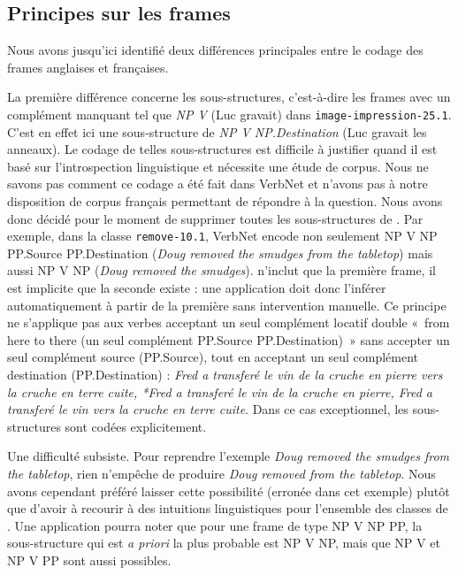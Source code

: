 \subsection{Principes sur les frames}\label{princp}

Nous avons jusqu'ici identifié deux différences principales entre le codage des
frames anglaises et françaises.

La première différence concerne les sous-structures, c'est-à-dire les frames
avec un complément manquant tel que \textit{NP V} (Luc gravait) dans
{\color{blue}\texttt{image-impression-25.1}}. C'est en effet ici une
sous-structure de \textit{NP V NP.Destination} (Luc gravait les anneaux). Le
codage de telles sous-structures est difficile à justifier quand il est basé
sur l'introspection linguistique et nécessite une étude de corpus. Nous ne
savons pas comment ce codage a été fait dans VerbNet et n'avons pas à notre
disposition de corpus français permettant de répondre à la question. Nous avons
donc décidé pour le moment de supprimer toutes les sous-structures de
\verbenet{}. Par exemple, dans la classe {\color{blue}\texttt{remove-10.1}},
VerbNet encode non seulement NP V NP PP.Source PP.Destination (\textit{Doug
removed the smudges from the tabletop}) mais aussi NP V NP (\textit{Doug
removed the smudges}). \verbenet{} n'inclut que la première frame, il est
implicite que la seconde existe : une application doit donc l'inférer
automatiquement à partir de la première sans intervention manuelle. Ce principe
ne s'applique pas aux verbes acceptant un seul complément locatif double «~from
here to there (un seul complément PP.Source PP.Destination)~» sans accepter un
seul complément source (PP.Source), tout en acceptant un seul complément
destination (PP.Destination) : \textit{Fred a transferé le vin de la cruche en
pierre vers la cruche en terre cuite, *Fred a transferé le vin de la cruche en
pierre, Fred a transferé le vin vers la cruche en terre cuite}. Dans ce cas
exceptionnel, les sous-structures sont codées explicitement.

Une difficulté subsiste. Pour reprendre l'exemple \textit{Doug removed the
smudges from the tabletop}, rien n'empêche de produire \textit{Doug removed
from the tabletop}. Nous avons cependant préféré laisser cette possibilité
(erronée dans cet exemple) plutôt que d'avoir à recourir à des intuitions
linguistiques pour l'ensemble des classes de \verbenet{}. Une application
pourra noter que pour une frame de type NP V NP PP, la sous-structure qui est
\textit{a priori} la plus probable est NP V NP, mais que NP V et NP V PP sont
aussi possibles.

